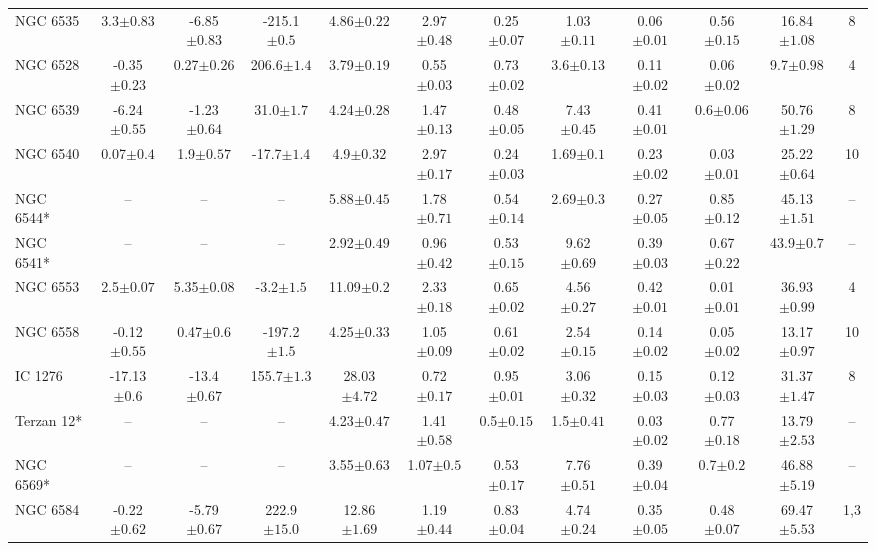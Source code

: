 \begin{landscape}
\begin{table}
\begin{tabular}{lccccccccccc}
NGC 6535 & 3.3$\pm{0.83}$ & -6.85$\pm{0.83}$ & -215.1$\pm{0.5}$ & 4.86$\pm{0.22}$ & 2.97$\pm{0.48}$ & 0.25$\pm{0.07}$ & 1.03$\pm{0.11}$ & 0.06$\pm{0.01}$ & 0.56$\pm{0.15}$ & 16.84$\pm{1.08}$&8 \\ 
NGC 6528 & -0.35$\pm{0.23}$ & 0.27$\pm{0.26}$ & 206.6$\pm{1.4}$ & 3.79$\pm{0.19}$ & 0.55$\pm{0.03}$ & 0.73$\pm{0.02}$ & 3.6$\pm{0.13}$ & 0.11$\pm{0.02}$ & 0.06$\pm{0.02}$ & 9.7$\pm{0.98}$&4 \\ 
NGC 6539 & -6.24$\pm{0.55}$ & -1.23$\pm{0.64}$ & 31.0$\pm{1.7}$ & 4.24$\pm{0.28}$ & 1.47$\pm{0.13}$ & 0.48$\pm{0.05}$ & 7.43$\pm{0.45}$ & 0.41$\pm{0.01}$ & 0.6$\pm{0.06}$ & 50.76$\pm{1.29}$&8 \\ 
NGC 6540 & 0.07$\pm{0.4}$ & 1.9$\pm{0.57}$ & -17.7$\pm{1.4}$ & 4.9$\pm{0.32}$ & 2.97$\pm{0.17}$ & 0.24$\pm{0.03}$ & 1.69$\pm{0.1}$ & 0.23$\pm{0.02}$ & 0.03$\pm{0.01}$ & 25.22$\pm{0.64}$&10 \\ 
NGC 6544* & -- & -- & -- & 5.88$\pm{0.45}$ & 1.78$\pm{0.71}$ & 0.54$\pm{0.14}$ & 2.69$\pm{0.3}$ & 0.27$\pm{0.05}$ & 0.85$\pm{0.12}$ & 45.13$\pm{1.51}$&-- \\ 
NGC 6541* & -- & -- & -- & 2.92$\pm{0.49}$ & 0.96$\pm{0.42}$ & 0.53$\pm{0.15}$ & 9.62$\pm{0.69}$ & 0.39$\pm{0.03}$ & 0.67$\pm{0.22}$ & 43.9$\pm{0.7}$&-- \\ 
NGC 6553 & 2.5$\pm{0.07}$ & 5.35$\pm{0.08}$ & -3.2$\pm{1.5}$ & 11.09$\pm{0.2}$ & 2.33$\pm{0.18}$ & 0.65$\pm{0.02}$ & 4.56$\pm{0.27}$ & 0.42$\pm{0.01}$ & 0.01$\pm{0.01}$ & 36.93$\pm{0.99}$&4 \\ 
NGC 6558 & -0.12$\pm{0.55}$ & 0.47$\pm{0.6}$ & -197.2$\pm{1.5}$ & 4.25$\pm{0.33}$ & 1.05$\pm{0.09}$ & 0.61$\pm{0.02}$ & 2.54$\pm{0.15}$ & 0.14$\pm{0.02}$ & 0.05$\pm{0.02}$ & 13.17$\pm{0.97}$&10 \\ 
IC 1276 & -17.13$\pm{0.6}$ & -13.4$\pm{0.67}$ & 155.7$\pm{1.3}$ & 28.03$\pm{4.72}$ & 0.72$\pm{0.17}$ & 0.95$\pm{0.01}$ & 3.06$\pm{0.32}$ & 0.15$\pm{0.03}$ & 0.12$\pm{0.03}$ & 31.37$\pm{1.47}$&8 \\ 
Terzan 12* & -- & -- & -- & 4.23$\pm{0.47}$ & 1.41$\pm{0.58}$ & 0.5$\pm{0.15}$ & 1.5$\pm{0.41}$ & 0.03$\pm{0.02}$ & 0.77$\pm{0.18}$ & 13.79$\pm{2.53}$&-- \\ 
NGC 6569* & -- & -- & -- & 3.55$\pm{0.63}$ & 1.07$\pm{0.5}$ & 0.53$\pm{0.17}$ & 7.76$\pm{0.51}$ & 0.39$\pm{0.04}$ & 0.7$\pm{0.2}$ & 46.88$\pm{5.19}$&-- \\ 
NGC 6584 & -0.22$\pm{0.62}$ & -5.79$\pm{0.67}$ & 222.9$\pm{15.0}$ & 12.86$\pm{1.69}$ & 1.19$\pm{0.44}$ & 0.83$\pm{0.04}$ & 4.74$\pm{0.24}$ & 0.35$\pm{0.05}$ & 0.48$\pm{0.07}$ & 69.47$\pm{5.53}$&1,3 \\ 

\end{tabular}
\end{table}
\end{landscape}
